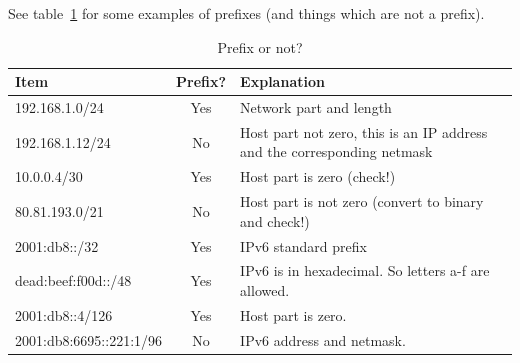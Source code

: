 See table~\ref{tab:prefixornot} for some examples of prefixes (and things which are not a prefix).
\begin{table}[hbp]
  \caption{Prefix or not?}
  \label{tab:prefixornot}
  \begin{tabularx}{\textwidth}{lcX}
    \textbf{Item} & \textbf{Prefix?} & \textbf{Explanation} \\
    \hline
    192.168.1.0/24 & Yes & Network part and length \\
    192.168.1.12/24 & No & Host part not zero, this is an IP address and the
                            corresponding netmask \\
    10.0.0.4/30 & Yes & Host part is zero (check!) \\
    80.81.193.0/21 & No & Host part is not zero (convert to binary and check!) \\
    \hline
    2001:db8::/32 & Yes & IPv6 standard prefix \\
    dead:beef:f00d::/48 & Yes & IPv6 is in hexadecimal. So letters a-f are allowed. \\
    2001:db8::4/126 & Yes & Host part is zero. \\
    2001:db8:6695::221:1/96 & No & IPv6 address and netmask. \\
  \end{tabularx}
\end{table}

